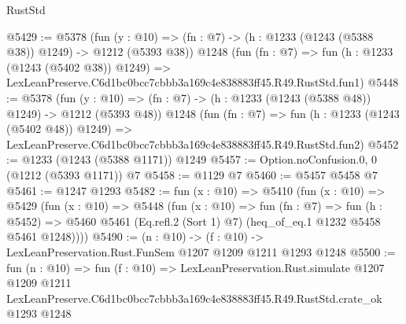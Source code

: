 \begin{lexlean}{RustStd}
\begin{coremodule}
@5429 := @5378
    (fun (y : @10) => (fn : @7) -> (h : @1233 (@1243 (@5388 @38)) @1249) -> @1212 (@5393 @38))
    @1248
    (fun (fn : @7) =>
    fun (h : @1233 (@1243 (@5402 @38)) @1249) =>
    LexLeanPreserve.C6d1bc0bcc7cbbb3a169c4e838883ff45.R49.RustStd.fun1)
@5448 := @5378
    (fun (y : @10) => (fn : @7) -> (h : @1233 (@1243 (@5388 @48)) @1249) -> @1212 (@5393 @48))
    @1248
    (fun (fn : @7) =>
    fun (h : @1233 (@1243 (@5402 @48)) @1249) =>
    LexLeanPreserve.C6d1bc0bcc7cbbb3a169c4e838883ff45.R49.RustStd.fun2)
@5452 := @1233 (@1243 (@5388 @1171)) @1249
@5457 := Option.noConfusion.{0, 0} (@1212 (@5393 @1171)) @7
@5458 := @1129 @7
@5460 := @5457 @5458 @7
@5461 := @1247 @1293
@5482 := fun (x : @10) =>
  @5410
    (fun (x : @10) =>
    @5429
      (fun (x : @10) =>
      @5448
        (fun (x : @10) =>
        fun (fn : @7) =>
        fun (h : @5452) =>
        @5460 @5461 (Eq.refl.{2} (Sort 1) @7) (heq_of_eq.{1} @1232 @5458 @5461 @1248))))
@5490 := (n : @10) -> (f : @10) -> LexLeanPreservation.Rust.FunSem @1207 @1209 @1211 @1293 @1248
@5500 := fun (n : @10) =>
  fun (f : @10) =>
  LexLeanPreservation.Rust.simulate
    @1207
    @1209
    @1211
    LexLeanPreserve.C6d1bc0bcc7cbbb3a169c4e838883ff45.R49.RustStd.crate_ok
    @1293
    @1248
\end{coremodule}
\end{lexlean}

